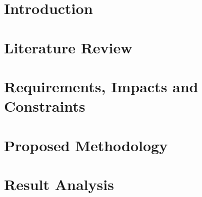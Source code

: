 \documentclass[Times,12pt,oneside,openany,print,index]{report}
\renewcommand{\nomgroup}[1]{%
  \item[]\hspace*{-\leftmargin}\textbf{%
  \ifstrequal{#1}{A}{Abbreviations}{%
  \ifstrequal{#1}{B}{Persona banks, contrasts and the knowledge direction}{}}}\medskip}
\let\cleardoublepage=\clearpage %
\begin{document}
\cleardoublepage
{}
{}
\begingroup
\makeatletter
\nom@tempdim\nomlabelwidth\relax
\def\nom@lastgroup{}%
\renewcommand{\nomenclature}[3][]{%
  \edef\nom@thisgroup{\@car#1\relax\@nil}%
  \ifx\nom@thisgroup\nom@lastgroup\else
    \expandafter\nomgroup\expandafter{\nom@thisgroup}%
    \global\let\nom@lastgroup\nom@thisgroup
  \fi
  \item[{#2}]\begingroup#3\nomentryend\endgroup}%
\begin{thenomenclature}

\end{thenomenclature}
\makeatother
\endgroup
\cleardoublepage


\chapter{Introduction}


\chapter{Literature Review}


\chapter{Requirements, Impacts and Constraints
}



\chapter{Proposed Methodology}


\chapter{Result Analysis}

\end{document}
